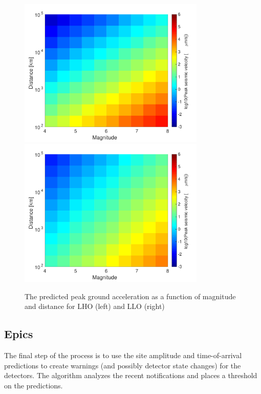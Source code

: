 \documentclass[reprint, prl, aps, showpacs]{revtex4-1}
\begin{document}
\begin{figure}[t]
\hspace*{-0.5cm}
 \includegraphics[width=3.5in]{LHO_M_r.pdf}
 \includegraphics[width=3.5in]{LLO_M_r.pdf}
 \caption{The predicted peak ground acceleration as a function of magnitude and distance for LHO (left) and LLO (right)}
 \label{fig:MvsR}
\end{figure}

\subsection{Epics}

The final step of the process is to use the site amplitude and time-of-arrival predictions to create warnings (and possibly detector state changes) for the detectors.
The algorithm analyzes the recent notifications and places a threshold on the predictions.
\end{document}
